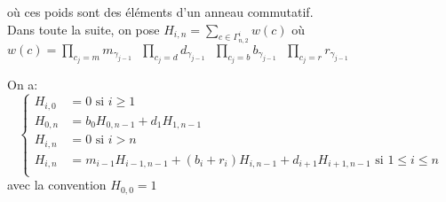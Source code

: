 où ces poids sont des éléments d'un anneau commutatif.\vspace{10pt}\\
Dans toute la suite, on pose $H_{i,n} = \underset{c\in \Gamma_{n,2}^{i}}{\sum}w(c)$ où $w(c) = \underset{c_{j}=m}{\prod}
	m_{\gamma_{j-1}}\text{ } \underset{c_{j}=d}{\prod}d_{\gamma_{j-1}}\text{ }\underset{c_{j}=b}{\prod}
	b_{\gamma_{j-1}}\text{ }\underset{c_{j}=r}{\prod}r_{\gamma_{j-1}}$\\
\begin{proposition} \label{weight-tab}
	On a:
	\[
		\begin{cases}
			H_{i,0} & =0 \text{ si }i\geq 1                                                                  \\
			H_{0,n} & =b_{0}H_{0,n-1}+d_{1}H_{1,n-1}                                                         \\
			H_{i,n} & =0 \text{ si } i>n                                                                     \\
			H_{i,n} & =m_{i-1}H_{i-1,n-1}+(b_{i}+r_{i})H_{i,n-1}+d_{i+1}H_{i+1,n-1} \text{ si }1\leq i\leq n \\
		\end{cases}
	\]
	avec la convention $H_{0,0}=1$
\end{proposition}

